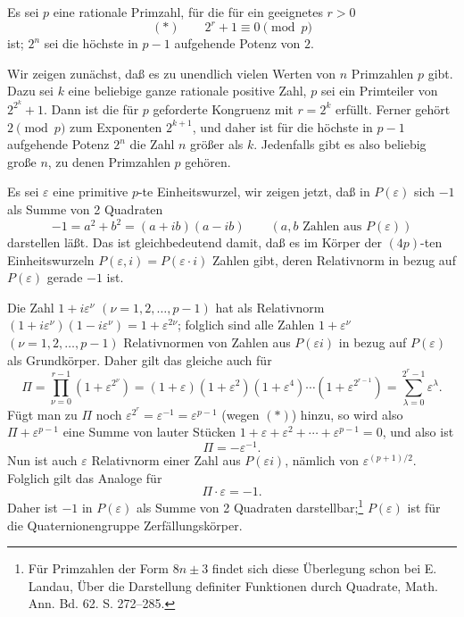 

Es sei $p$ eine rationale Primzahl, für die für ein geeignetes $r>0$
\[
        (*)\qquad 2^r+1\equiv0\pmod p
\]
ist; $2^n$ sei die höchste in $p-1$ aufgehende Potenz von $2$.

Wir zeigen zunächst, daß es zu unendlich vielen Werten von $n$ Primzahlen $p$ gibt. Dazu sei $k$ eine beliebige ganze rationale positive Zahl, $p$ sei ein Primteiler von $2^{2^k}+1$. Dann ist die für $p$ geforderte Kongruenz mit $r=2^k$ erfüllt. Ferner gehört $2\pmod p$ zum Exponenten $2^{k+1}$, und daher ist für die höchste in $p-1$ aufgehende Potenz $2^n$ die Zahl $n$ größer als $k$. Jedenfalls gibt es also beliebig große $n$, zu denen Primzahlen $p$ gehören.

Es sei $\varepsilon$ eine primitive $p$-te Einheitswurzel, wir zeigen jetzt, daß in $P(\varepsilon)$ sich $-1$ als Summe von 2 Quadraten
\[
        -1=a^2+b^2=(a+ib)(a-ib)\qquad (a,b\text{ Zahlen aus }P(\varepsilon))
\]
darstellen läßt. Das ist gleichbedeutend damit, daß es im Körper der $(4p)$-ten Einheitswurzeln $P(\varepsilon,i)=P(\varepsilon\cdot i)$ Zahlen gibt, deren Relativnorm in bezug auf $P(\varepsilon)$ gerade $-1$ ist.

Die Zahl $1+i\varepsilon^\nu$ $(\nu=1,2,\ldots,p-1)$ hat als Relativnorm $(1+i\varepsilon^\nu)(1-i\varepsilon^\nu)=1+\varepsilon^{2\nu}$; folglich sind alle Zahlen $1+\varepsilon^\nu$ $(\nu=1,2,\ldots,p-1)$ Relativnormen von Zahlen aus $P(\varepsilon i)$ in bezug auf $P(\varepsilon)$ als Grundkörper. Daher gilt das gleiche auch für
\[
\Pi=\prod_{\nu=0}^{r-1}(1+\varepsilon^{2^\nu})
=(1+\varepsilon)(1+\varepsilon^2)(1+\varepsilon^4)\cdots(1+\varepsilon^{2^{r-1}})
=\sum_{\lambda=0}^{2^r-1}\varepsilon^\lambda.
\]
Fügt man zu $\Pi$ noch $\varepsilon^{2^r}=\varepsilon^{-1}=\varepsilon^{p-1}$ (wegen $(*)$) hinzu, so wird also $\Pi+\varepsilon^{p-1}$ eine Summe von lauter Stücken $1+\varepsilon+\varepsilon^2+\cdots+\varepsilon^{p-1}=0$, und also ist
\[
        \Pi=-\varepsilon^{-1}.
\]
Nun ist auch $\varepsilon$ Relativnorm einer Zahl aus $P(\varepsilon i)$, nämlich von $\varepsilon^{(p+1)/2}$. Folglich gilt das Analoge für
\[
        \Pi\cdot\varepsilon=-1.
\]
Daher ist $-1$ in $P(\varepsilon)$ als Summe von 2 Quadraten darstellbar;\footnote{Für Primzahlen der Form $8n\pm3$ findet sich diese Überlegung schon bei E. Landau, Über die Darstellung definiter Funktionen durch Quadrate, Math. Ann. Bd. 62. S. 272--285.} $P(\varepsilon)$ ist für die Quaternionengruppe Zerfällungskörper.

